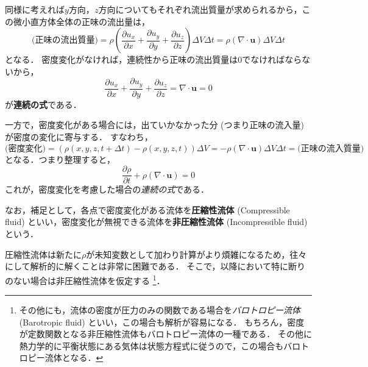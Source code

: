 \documentclass[uplatex,dvipdfmx,a4j,11pt]{jsreport}
\newcommand{\keyword}[1]{\textcolor{mainblue}{\textbf{#1}}}
\numberwithin{equation}{chapter}
\begin{document}
同様に考えれば$y$方向，$z$方向についてもそれぞれ流出質量が求められるから，この微小直方体全体の正味の流出量は，
\begin{equation}
  \text{(正味の流出質量)} = \rho \left(\frac{\partial u_x}{\partial x} + \frac{\partial u_y}{\partial y} + \frac{\partial u_z}{\partial z}\right) \Delta V \Delta t = \rho (\nabla \cdot \mathbf{u}) \Delta V \Delta t
\end{equation}
となる．
密度変化がなければ，連続性から正味の流出質量は0でなければならないから，
\begin{equation}
  \frac{\partial u_x}{\partial x} + \frac{\partial u_y}{\partial y} + \frac{\partial u_z}{\partial z} = \nabla \cdot \mathbf{u} = 0
  \label{eq:incompressible_continuity}
\end{equation}
が\keyword{連続の式}である．

一方で，密度変化がある場合には，出ていかなかった分 (つまり正味の流入量) が密度の変化に寄与する．
すなわち，
\begin{equation*}
  \text{(密度変化)} = 
  \left(\rho(x, y, z, t + \Delta t) - \rho(x, y, z, t)\right)\Delta V = -\rho (\nabla \cdot \mathbf{u}) \Delta V \Delta t = \text{(正味の流入質量)}
\end{equation*}
となる．つまり整理すると，
\begin{equation}
  \frac{\partial \rho}{\partial t} + \rho (\nabla \cdot \mathbf{u}) = 0
  \label{eq:compressible_continuity}
\end{equation}
これが，密度変化を考慮した場合の\emph{連続の式}である．

なお，補足として，各点で密度変化がある流体を\keyword{圧縮性流体} (Compressible fluid) といい，密度変化が無視できる流体を\keyword{非圧縮性流体} (Incompressible fluid) という．

圧縮性流体は新たに$\rho$が未知変数として加わり計算がより煩雑になるため，往々にして解析的に解くことは非常に困難である．
そこで，以降において特に断りのない場合は非圧縮性流体を仮定する
\footnote{
  その他にも，流体の密度が圧力のみの関数である場合を\emph{バロトロピー流体} (Barotropic fluid) といい，この場合も解析が容易になる．
  もちろん，密度が定数関数となる非圧縮性流体もバロトロピー流体の一種である．
  その他に熱力学的に平衡状態にある気体は状態方程式に従うので，この場合もバロトロピー流体となる．
}．
\end{document}
